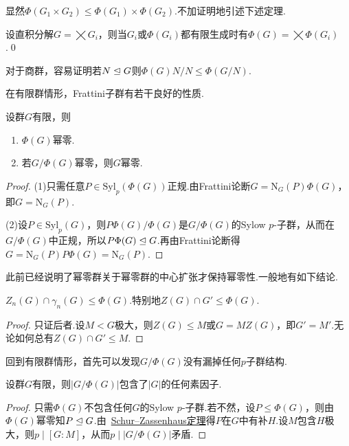 显然$\Phi(G_1\times G_2)\le\Phi(G_1)\times\Phi(G_2)$.不加证明地引述下述定理.
\begin{thm}
	设直积分解$G=\bigtimes G_i$，则当$G_i$或$\Phi(G_i)$都有限生成时有$\Phi(G)=\bigtimes\Phi(G_i)$.\qed
\end{thm}

对于商群，容易证明若$N\trianglelefteq G$则$\Phi(G)N/N\le\Phi(G/N)$.

在有限群情形，Frattini子群有若干良好的性质.
\begin{prop}
	设群$G$有限，则
	\begin{enumerate}
		\item $\Phi(G)$幂零.
		\item 若$G/\Phi(G)$幂零，则$G$幂零.
	\end{enumerate}
\end{prop}
\begin{proof}
	\hspace*{5.2pt}(1)只需任意$P\in\mathrm{Syl}_p(\Phi(G))$正规.由Frattini论断$G=\mathrm{N}_G(P)\Phi(G)$，即$G=\mathrm{N}_G(P)$.

	(2)设$P\in\mathrm{Syl}_p(G)$，则$P\Phi(G)/\Phi(G)$是$G/\Phi(G)$的Sylow $p$-子群，从而在$G/\Phi(G)$中正规，所以$P\Phi(G)\trianglelefteq G$.再由Frattini论断得$G=\mathrm{N}_G(P)P\Phi(G)=\mathrm{N}_G(P)$.
\end{proof}

此前已经说明了幂零群关于幂零群的中心扩张才保持幂零性.一般地有如下结论.
\begin{prop}
	$Z_n(G)\cap\gamma_n(G)\le\Phi(G)$.特别地$Z(G)\cap G'\le\Phi(G)$.
\end{prop}
\begin{proof}
	只证后者.设$M<G$极大，则$Z(G)\le M$或$G=MZ(G)$，即$G'=M'$.无论如何总有$Z(G)\cap G'\le M$.
\end{proof}

回到有限群情形，首先可以发现$G/\Phi(G)$没有漏掉任何$p$子群结构.
\begin{prop}
	设群$G$有限，则$|G/\Phi(G)|$包含了$|G|$的任何素因子.
\end{prop}
\begin{proof}
	只需$\Phi(G)$不包含任何$G$的Sylow $p$-子群.若不然，设$P\le\Phi(G)$，则由$\Phi(G)$幂零知$P\trianglelefteq G$.由~\hyperlink{thm:SchurZassenhaus}{Schur--Zassenhaus定理}得$P$在$G$中有补$H$.设$M$包含$H$极大，则$p\mid[G:M]$，从而$p\mid|G/\Phi(G)|$矛盾.
\end{proof}

